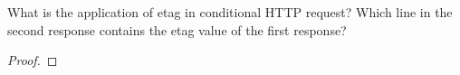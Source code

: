 \documentclass[../../main.tex]{subfiles}
\begin{document}
\begin{wts}
What is the application of etag in conditional HTTP request? Which line in the second response contains the etag value of the first response?
\end{wts}
\begin{proof}

\end{proof}
\end{document}
